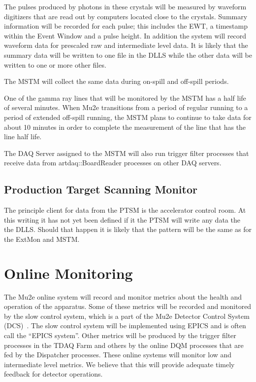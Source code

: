 The pulses produced by photons in these crystals will be measured by waveform digitizers that are read out
by computers located close to the crystals.
Summary information will be recorded for each pulse; this includes the EWT,
a timestamp within the Event Window and a pulse height.
In addition the system will record waveform data for prescaled raw and intermediate level data.
It is likely that the summary data will be written to one file in the DLLS
while the other data will be written to one or more other files.

The MSTM will collect the same data during on-spill and off-spill periods.

One of the gamma ray lines that will be monitored by the MSTM has a half life of several minutes.
When Mu2e transitions from a period of regular running to a period of extended off-spill running,
the MSTM plans to continue to take data for about 10 minutes in order to complete the measurement
of the line that has the line half life.




\begin{sloppypar}
The DAQ Server assigned to the MSTM will also run trigger filter processes that receive
data from {\code artdaq::BoardReader} processes on other DAQ servers.
\end{sloppypar}


\subsection{Production Target Scanning Monitor}

The principle client for data from the PTSM is the accelerator control room.
At this writing it has not yet been defined if it the PTSM will write any data the the DLLS.
Should that happen it is likely that the pattern will be the same as for the ExtMon
and MSTM.

\section{Online Monitoring}
\label{sec:onlineMonitoring}

The Mu2e online system will record and monitor metrics about the health and operation of the apparatus.
Some of these metrics will be recorded and monitored by the slow control system,
which is a part	of the Mu2e Detector Control System (DCS)~\cite{DCSSpec}.
The slow control system will be implemented using EPICS and is often call the ``EPICS system''.
Other metrics will be produced by the trigger filter processes in the TDAQ Farm
and others by the online DQM processes that are fed by the Dispatcher processes.
These online systems will monitor low and intermediate level metrics.
We believe that this will provide adequate timely feedback for detector operations.

